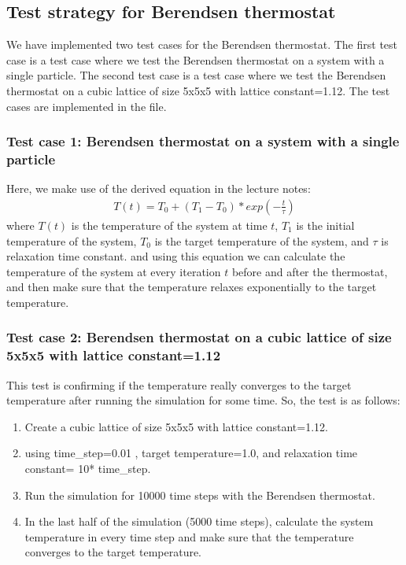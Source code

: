     \subsection{Test strategy for Berendsen thermostat}
    We have implemented two test cases for the Berendsen thermostat. The first test case is a test case where we test the Berendsen thermostat on a system with a single particle. The second test case is a test case where we test the Berendsen thermostat on a cubic lattice of size 5x5x5 with lattice constant=1.12. The test cases are implemented in the file.

    \subsubsection{Test case 1: Berendsen thermostat on a system with a single particle}
    Here, we make use of the derived equation in the lecture notes:
    \begin{equation}
    \label{eq:berendsen}
        \begin{aligned}
            T(t) = T_0 + (T_1-T_0)*{exp(-\frac{t}{\tau})}
        \end{aligned}
    \end{equation}
    where $T(t)$ is the temperature of the system at time $t$, $T_1$ is the initial temperature of the system, $T_0$ is the target temperature of the system, and $\tau$ is relaxation time constant. and using this equation we can calculate the temperature of the system at every iteration $t$ before and after the thermostat, and then make sure that the temperature relaxes exponentially to the target temperature.

    \subsubsection{Test case 2: Berendsen thermostat on a cubic lattice of size 5x5x5 with lattice constant=1.12}
    This test is confirming if the temperature really converges to the target temperature after running the simulation for some time. So, the test is as follows:
    \begin{enumerate}
        \item Create a cubic lattice of size 5x5x5 with lattice constant=1.12.
        \item using time\_step=0.01 , target temperature=1.0, and relaxation time constant= 10* time\_step.
        \item Run the simulation for 10000 time steps with the Berendsen thermostat.
        \item In the last half of the simulation (5000 time steps), calculate the system temperature in every time step and make sure that the temperature converges to the target temperature.
    \end{enumerate}


